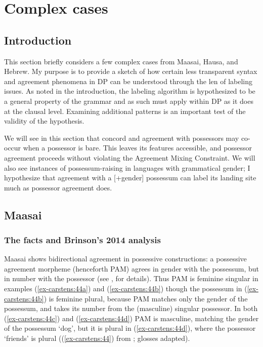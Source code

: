 \documentclass[output=paper
,modfonts
,nonflat]{langsci/langscibook}
\begin{document}
\section{Complex cases} \label{sec-carstens:6}
\subsection{Introduction} \label{sec-carstens:6.1}

This section briefly considers a few complex cases from Maasai, Hausa, and Hebrew. My purpose is to provide a sketch of how certain less transparent syntax and agreement phenomena in DP can be understood through the len of labeling issues. As noted in the introduction, the labeling algorithm is hypothesized to be a general property of the grammar and as such must apply within DP as it does at the clausal level. Examining additional patterns is an important test of the validity of the hypothesis.

We will see in this section that concord and agreement with possessors may co-occur when a possessor is bare. This leaves its features accessible, and possessor agreement proceeds without violating the Agreement Mixing Constraint. We will also see instances of possessum-raising in languages with grammatical gender; I hypothesize that agreement with a [+gender] possessum can label its landing site much as possessor agreement does.

\subsection{Maasai} \label{sec-carstens:6.2}
\subsubsection{The facts and Brinson's 2014 analysis} \label{sec-carstens:6.2.1}
Maasai shows bidirectional agreement in possessive constructions: a possessive agreement morpheme (henceforth PAM) agrees in gender with the possessum, but in number with the possessor (see \citealt{Storto2003}, \citealt{Brinson2014} for details). Thus PAM is feminine singular in examples (\ref{ex-carstens:44a}) and (\ref{ex-carstens:44b}) though the possessum in (\ref{ex-carstens:44b}) is feminine plural, because PAM matches only the gender of the possessum, and takes its number from the (masculine) singular possessor. In both (\ref{ex-carstens:44c}) and (\ref{ex-carstens:44d}) PAM  is masculine, matching the gender of the possessum `dog', but it is plural in (\ref{ex-carstens:44d}), where the possessor `friends' is plural ((\ref{ex-carstens:44}) from \citealt{Brinson2014}; glosses adapted).
\end{document}
